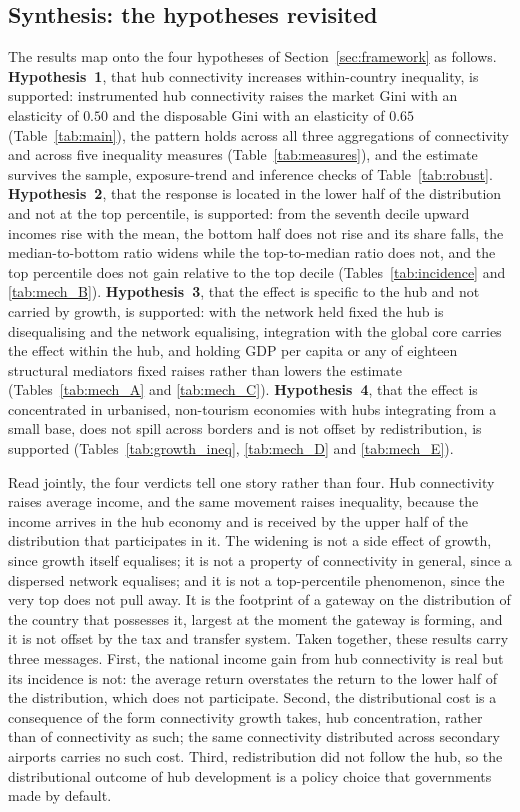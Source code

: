 \subsection{Synthesis: the hypotheses revisited}
\label{sec:synthesis}
The results map onto the four hypotheses of Section~\ref{sec:framework} as follows. \textbf{Hypothesis~1}, that hub connectivity increases within-country inequality, is supported: instrumented hub connectivity raises the market Gini with an elasticity of $0.50$ and the disposable Gini with an elasticity of $0.65$ (Table~\ref{tab:main}), the pattern holds across all three aggregations of connectivity and across five inequality measures (Table~\ref{tab:measures}), and the estimate survives the sample, exposure-trend and inference checks of Table~\ref{tab:robust}. \textbf{Hypothesis~2}, that the response is located in the lower half of the distribution and not at the top percentile, is supported: from the seventh decile upward incomes rise with the mean, the bottom half does not rise and its share falls, the median-to-bottom ratio widens while the top-to-median ratio does not, and the top percentile does not gain relative to the top decile (Tables~\ref{tab:incidence} and \ref{tab:mech_B}). \textbf{Hypothesis~3}, that the effect is specific to the hub and not carried by growth, is supported: with the network held fixed the hub is disequalising and the network equalising, integration with the global core carries the effect within the hub, and holding GDP per capita or any of eighteen structural mediators fixed raises rather than lowers the estimate (Tables~\ref{tab:mech_A} and \ref{tab:mech_C}). \textbf{Hypothesis~4}, that the effect is concentrated in urbanised, non-tourism economies with hubs integrating from a small base, does not spill across borders and is not offset by redistribution, is supported (Tables~\ref{tab:growth_ineq}, \ref{tab:mech_D} and \ref{tab:mech_E}).

Read jointly, the four verdicts tell one story rather than four. Hub connectivity raises average income, and the same movement raises inequality, because the income arrives in the hub economy and is received by the upper half of the distribution that participates in it. The widening is not a side effect of growth, since growth itself equalises; it is not a property of connectivity in general, since a dispersed network equalises; and it is not a top-percentile phenomenon, since the very top does not pull away. It is the footprint of a gateway on the distribution of the country that possesses it, largest at the moment the gateway is forming, and it is not offset by the tax and transfer system. Taken together, these results carry three messages. First, the national income gain from hub connectivity is real but its incidence is not: the average return overstates the return to the lower half of the distribution, which does not participate. Second, the distributional cost is a consequence of the form connectivity growth takes, hub concentration, rather than of connectivity as such; the same connectivity distributed across secondary airports carries no such cost. Third, redistribution did not follow the hub, so the distributional outcome of hub development is a policy choice that governments made by default.

